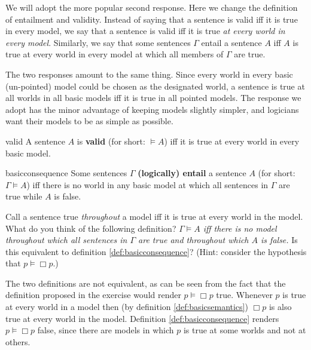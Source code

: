 We will adopt the more popular second response. Here we change the definition of
entailment and validity. Instead of saying that a sentence is valid iff it is
true in every model, we say that a sentence is valid iff it is true \emph{at
  every world in every model}. Similarly, we say that some sentences $\Gamma$
entail a sentence $A$ iff $A$ is true at every world in every model at which all
members of $\Gamma$ are true.

The two responses amount to the same thing. Since every world in every basic
(un-pointed) model could be chosen as the designated world, a sentence is true at all worlds in all basic models iff
it is true in all pointed models. The response we adopt has the minor advantage
of keeping models slightly simpler, and logicians want their models to be as
simple as possible.

\begin{definition}{}{valid}
  A sentence $A$ is \textbf{valid} (for short: $\models A$) iff
  it is true at every world in every basic model.
\end{definition}
%
\begin{definition}{}{basicconsequence}
  Some sentences $\Gamma$ \textbf{(logically) entail} a sentence $A$ (for short:
  $\Gamma \models A$) iff there is no world in any basic model at which all sentences in $\Gamma$ are true while $A$ is false.
\end{definition}

\begin{exercise}
  Call a sentence true \emph{throughout} a model iff it is true at every world
  in the model. What do you think of the following definition?
  \emph{$\Gamma \models A$ iff there is no model throughout which all sentences in 
  $\Gamma$ are true and throughout which $A$ is false.} Is this equivalent to
  definition \ref{def:basicconsequence}? (Hint: consider the hypothesis that
  $p \models \Box p$.)
\end{exercise}
\begin{solution}
  The two definitions are not equivalent, as can be seen from the fact that the
  definition proposed in the exercise would render $p \models \Box p$ true.
  Whenever $p$ is true at every world in a model then (by definition
  \ref{def:basicsemantics}) $\Box p$ is also true at every world in the model.
  Definition \ref{def:basicconsequence} renders $p \models \Box p$ false, since
  there are models in which $p$ is true at some worlds and not at others.
\end{solution}

